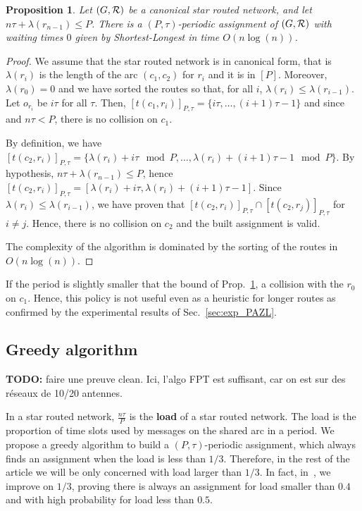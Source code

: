 \documentclass[a4paper,10pt]{article}
\newtheorem{proposition}{Proposition}
\begin{document}
      
      \begin{proposition} Let $(G, {\cal R})$ be a canonical star routed network, and let $n\tau + \lambda(r_{n-1}) \leq P$. There is a $(P,\tau)$-periodic assignment of $(G, {\cal R})$ with waiting times $0$ given by Shortest-Longest in time $O(n\log(n))$.\label{prop:SL}
      \end{proposition}
      \begin{proof}
       We assume that the star routed network is in canonical form, that is $\lambda(r_i)$ is the length
       of the arc $(c_1,c_2)$ for $r_i$ and it is in $[P]$. Moreover, $\lambda(r_0) = 0$ and we have 
       sorted the routes so that, for all $i$, $\lambda(r_i) \leq \lambda(r_{i-1})$.
       Let $o_{r_i}$ be $i\tau$ for all $\tau$. Then, $[t(c_1,r_{i})]_{P,\tau} = \{i\tau,\dots, (i+1)\tau -1\}$ and since and $n\tau < P$, there is no collision on $c_1$. 

       By definition, we have  $[t(c_2,r_{i})]_{P,\tau} = \{\lambda(r_{i}) + i\tau \mod P, \dots, \lambda(r_{i}) + (i+1)\tau -1 \mod P\}$. By hypothesis, $n\tau + \lambda(r_{n-1}) \leq P$, hence $[t(c_2,r_{i})]_{P,\tau} = [\lambda(r_{i}) + i\tau, \lambda(r_{i}) + (i+1)\tau -1]$. Since  $\lambda(r_i) \leq \lambda(r_{i-1})$, we have proven that $[t(c_2,r_{i})]_{P,\tau} \cap [t(c_2,r_{j})]_{P,\tau}$ for $i \neq j$. Hence, there is no collision on $c_2$ and the built assignment is valid.

 		The complexity of the algorithm is dominated by the sorting of the routes in $O(n\log(n))$. 
      \end{proof}

      If the period is slightly smaller that the bound of Prop.~\ref{prop:SL}, a collision with the $r_0$ on $c_1$. Hence, this policy is not useful even as a heuristic for longer routes as confirmed by the experimental results of Sec.~\ref{sec:exp_PAZL}. 

   
    \subsection{Greedy algorithm}
    
    \textbf{TODO:} faire une preuve clean. Ici, l'algo FPT est suffisant, car 
    on est sur des réseaux de 10/20 antennes.
    
      In a star routed network,  $\frac{n\tau}{P}$ is the \textbf{load} of a star routed network. The load is the proportion of time slots used by messages on the shared arc in a period. We propose a greedy algorithm to build a $(P,\tau)$-periodic assignment, which always finds an assignment when the load is less than $1/3$. Therefore, in the rest of the article we will be only concerned with load larger than $1/3$. In fact, in~\cite{guiraud2020scheduling}, we improve on $1/3$, proving there is always an assignment for load smaller than $0.4$ and with high probability for load less than $0.5$.
\end{document}
